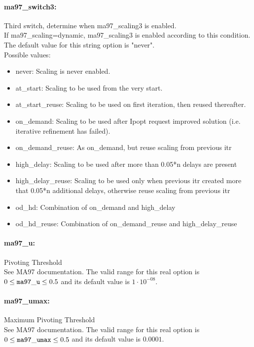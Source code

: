 \paragraph{ma97\_switch3:}\label{opt:ma97_switch3} Third switch, determine when ma97\_scaling3 is enabled. \\
 If ma97\_scaling=dynamic, ma97\_scaling3 is enabled according to this condition. The default value for this string option is "never".
\\ 
Possible values:
\begin{itemize}
   \item never: Scaling is never enabled.
   \item at\_start: Scaling to be used from the very start.
   \item at\_start\_reuse: Scaling to be used on first iteration, then reused thereafter.
   \item on\_demand: Scaling to be used after Ipopt request improved solution (i.e. iterative refinement has failed).
   \item on\_demand\_reuse: As on\_demand, but reuse scaling from previous itr
   \item high\_delay: Scaling to be used after more than 0.05*n delays are present
   \item high\_delay\_reuse: Scaling to be used only when previous itr created more that 0.05*n additional delays, otherwise reuse scaling from previous itr
   \item od\_hd: Combination of on\_demand and high\_delay
   \item od\_hd\_reuse: Combination of on\_demand\_reuse and high\_delay\_reuse
\end{itemize}

\paragraph{ma97\_u:}\label{opt:ma97_u} Pivoting Threshold \\
 See MA97 documentation. The valid range for this real option is 
$0 \le {\tt ma97\_u } \le 0.5$
and its default value is $1 \cdot 10^{-08}$.


\paragraph{ma97\_umax:}\label{opt:ma97_umax} Maximum Pivoting Threshold \\
 See MA97 documentation. The valid range for this real option is 
$0 \le {\tt ma97\_umax } \le 0.5$
and its default value is $0.0001$.


